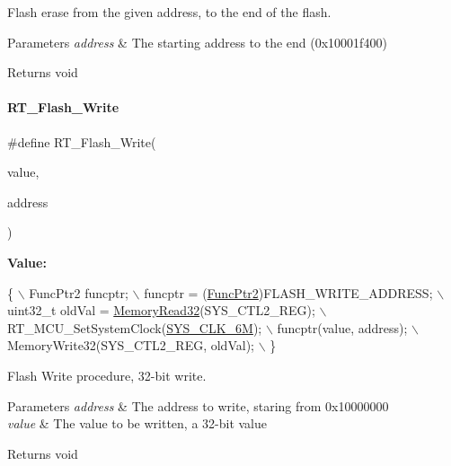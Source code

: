 Flash erase from the given address, to the end of the flash. 


\begin{DoxyParams}{Parameters}
{\em address} & The starting address to the end (0x10001f400) \\
\hline
\end{DoxyParams}
\begin{DoxyReturn}{Returns}
void 
\end{DoxyReturn}
\mbox{\label{a00008_a13fb43316f72b3b1b9467a91fca08d5c}} 
\paragraph{\texorpdfstring{R\+T\+\_\+\+Flash\+\_\+\+Write}{RT\_Flash\_Write}}
{\footnotesize\ttfamily \#define R\+T\+\_\+\+Flash\+\_\+\+Write(\begin{DoxyParamCaption}\item[{}]{value,  }\item[{}]{address }\end{DoxyParamCaption})}

{\bfseries Value\+:}
\begin{DoxyCode}
\{                                                   \(\backslash\)
        FuncPtr2 funcptr;                               \(\backslash\)
        funcptr = (\mbox{\hyperlink{a00020_a331a88eeefe11112bb8fe1b43dd777b8}{FuncPtr2}})FLASH\_WRITE\_ADDRESS;        \(\backslash\)
        uint32\_t oldVal = \mbox{\hyperlink{a00020_a706b02571285f92589fbb0b964d7d0bb}{MemoryRead32}}(SYS\_CTL2\_REG);   \(\backslash\)
        RT\_MCU\_SetSystemClock(\mbox{\hyperlink{a00020_ae3a2d501b8662e11b969fb4a5e195e5bad1640aa8c46162a7551abca12293ef39}{SYS\_CLK\_6M}});              \(\backslash\)
        funcptr(value, address);                        \(\backslash\)
        MemoryWrite32(SYS\_CTL2\_REG, oldVal);            \(\backslash\)
    \}
\end{DoxyCode}


Flash Write procedure, 32-\/bit write. 


\begin{DoxyParams}{Parameters}
{\em address} & The address to write, staring from 0x10000000 \\
\hline
{\em value} & The value to be written, a 32-\/bit value \\
\hline
\end{DoxyParams}
\begin{DoxyReturn}{Returns}
void 
\end{DoxyReturn}
